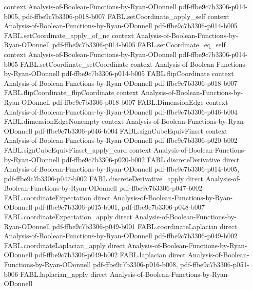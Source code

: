 \begin{theorem}
  {context}
  {Analysis-of-Boolean-Functions-by-Ryan-ODonnell}
  {pdf-ffbe9c7b3306-p014-b005,
    pdf-ffbe9c7b3306-p018-b007}
\proofstep
  {FABL.setCoordinate_apply_self}
  {context}
  {Analysis-of-Boolean-Functions-by-Ryan-ODonnell}
  {pdf-ffbe9c7b3306-p014-b005}
\proofstep
  {FABL.setCoordinate_apply_of_ne}
  {context}
  {Analysis-of-Boolean-Functions-by-Ryan-ODonnell}
  {pdf-ffbe9c7b3306-p014-b005}
\proofstep
  {FABL.setCoordinate_eq_self}
  {context}
  {Analysis-of-Boolean-Functions-by-Ryan-ODonnell}
  {pdf-ffbe9c7b3306-p014-b005}
\proofstep
  {FABL.setCoordinate_setCoordinate}
  {context}
  {Analysis-of-Boolean-Functions-by-Ryan-ODonnell}
  {pdf-ffbe9c7b3306-p014-b005}
\proofstep
  {FABL.flipCoordinate}
  {context}
  {Analysis-of-Boolean-Functions-by-Ryan-ODonnell}
  {pdf-ffbe9c7b3306-p018-b007}
\proofstep
  {FABL.flipCoordinate_flipCoordinate}
  {context}
  {Analysis-of-Boolean-Functions-by-Ryan-ODonnell}
  {pdf-ffbe9c7b3306-p018-b007}
\proofstep
  {FABL.DimensionEdge}
  {context}
  {Analysis-of-Boolean-Functions-by-Ryan-ODonnell}
  {pdf-ffbe9c7b3306-p046-b004}
\proofstep
  {FABL.dimensionEdgeNonempty}
  {context}
  {Analysis-of-Boolean-Functions-by-Ryan-ODonnell}
  {pdf-ffbe9c7b3306-p046-b004}
\proofstep
  {FABL.signCubeEquivFinset}
  {context}
  {Analysis-of-Boolean-Functions-by-Ryan-ODonnell}
  {pdf-ffbe9c7b3306-p020-b002}
\proofstep
  {FABL.signCubeEquivFinset_apply_card}
  {context}
  {Analysis-of-Boolean-Functions-by-Ryan-ODonnell}
  {pdf-ffbe9c7b3306-p020-b002}
\proofstep
  {FABL.discreteDerivative}
  {direct}
  {Analysis-of-Boolean-Functions-by-Ryan-ODonnell}
  {pdf-ffbe9c7b3306-p014-b005,
    pdf-ffbe9c7b3306-p047-b002}
\proofstep
  {FABL.discreteDerivative_apply}
  {direct}
  {Analysis-of-Boolean-Functions-by-Ryan-ODonnell}
  {pdf-ffbe9c7b3306-p047-b002}
\proofstep
  {FABL.coordinateExpectation}
  {direct}
  {Analysis-of-Boolean-Functions-by-Ryan-ODonnell}
  {pdf-ffbe9c7b3306-p015-b001,
    pdf-ffbe9c7b3306-p048-b007}
\proofstep
  {FABL.coordinateExpectation_apply}
  {direct}
  {Analysis-of-Boolean-Functions-by-Ryan-ODonnell}
  {pdf-ffbe9c7b3306-p049-b001}
\proofstep
  {FABL.coordinateLaplacian}
  {direct}
  {Analysis-of-Boolean-Functions-by-Ryan-ODonnell}
  {pdf-ffbe9c7b3306-p049-b002}
\proofstep
  {FABL.coordinateLaplacian_apply}
  {direct}
  {Analysis-of-Boolean-Functions-by-Ryan-ODonnell}
  {pdf-ffbe9c7b3306-p049-b002}
\proofstep
  {FABL.laplacian}
  {direct}
  {Analysis-of-Boolean-Functions-by-Ryan-ODonnell}
  {pdf-ffbe9c7b3306-p016-b008,
    pdf-ffbe9c7b3306-p051-b006}
\proofstep
  {FABL.laplacian_apply}
  {direct}
  {Analysis-of-Boolean-Functions-by-Ryan-ODonnell}

\end{theorem}
